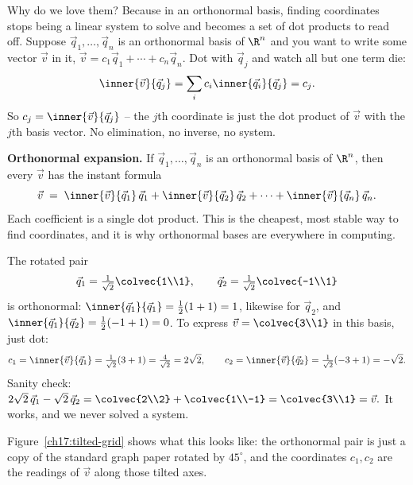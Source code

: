 Why do we love them? Because in an orthonormal basis, finding coordinates stops being a linear
system to solve and becomes a set of dot products to read off. Suppose $\vec q_1,\dots,\vec q_n$ is
an orthonormal basis of $\R^n$ and you want to write some vector $\vec v$ in it,
$\vec v = c_1\vec q_1+\cdots+c_n\vec q_n$. Dot with $\vec q_j$ and watch all but one term die:
\[
  \inner{\vec v}{\vec q_j} = \sum_i c_i\inner{\vec q_i}{\vec q_j} = c_j.
\]
So $c_j = \inner{\vec v}{\vec q_j}$ -- the $j$th coordinate is just the dot product of $\vec v$ with
the $j$th basis vector. No elimination, no inverse, no system.

\begin{focusbox}
\textbf{Orthonormal expansion.} If $\vec q_1,\dots,\vec q_n$ is an orthonormal basis of $\R^n$,
then every $\vec v$ has the instant formula
\[
  \vec v \;=\; \inner{\vec v}{\vec q_1}\,\vec q_1 + \inner{\vec v}{\vec q_2}\,\vec q_2
            + \cdots + \inner{\vec v}{\vec q_n}\,\vec q_n .
\]
Each coefficient is a single dot product. This is the cheapest, most stable way to find
coordinates, and it is why orthonormal bases are everywhere in computing.
\end{focusbox}

\begin{example}\label{ch17:rotated-basis}
The rotated pair
\[
  \vec q_1=\tfrac{1}{\sqrt2}\colvec{1\\1},\qquad
  \vec q_2=\tfrac{1}{\sqrt2}\colvec{-1\\1}
\]
is orthonormal: $\inner{\vec q_1}{\vec q_1}=\tfrac12(1+1)=1$, likewise for $\vec q_2$, and
$\inner{\vec q_1}{\vec q_2}=\tfrac12(-1+1)=0$. To express $\vec v=\colvec{3\\1}$ in this basis,
just dot:
\[
  c_1=\inner{\vec v}{\vec q_1}=\tfrac{1}{\sqrt2}(3+1)=\tfrac{4}{\sqrt2}=2\sqrt2,\qquad
  c_2=\inner{\vec v}{\vec q_2}=\tfrac{1}{\sqrt2}(-3+1)=-\sqrt2.
\]
Sanity check: $2\sqrt2\,\vec q_1 - \sqrt2\,\vec q_2 = \colvec{2\\2}+\colvec{1\\-1}=\colvec{3\\1}
=\vec v.$ It works, and we never solved a system.
\end{example}

Figure~\ref{ch17:tilted-grid} shows what this looks like: the orthonormal pair is just a copy of the
standard graph paper rotated by $45^\circ$, and the coordinates $c_1,c_2$ are the readings of $\vec v$
along those tilted axes.

